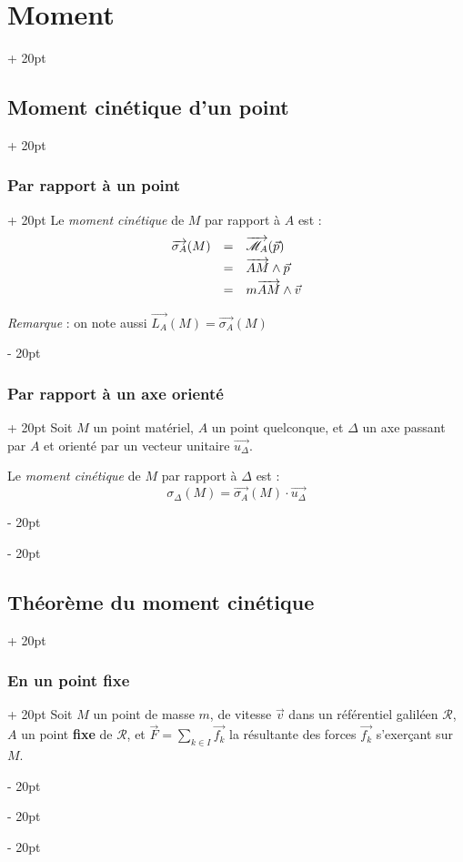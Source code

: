 \documentclass[a4paper, 12pt, twoside]{article}
\newcommand{\vect}{\overrightarrow}
\newcommand{\lr}[1]{\left( #1 \right)}
\newcommand{\ind}[1][20pt]{\advance\leftskip + #1}
\newcommand{\deind}[1][20pt]{\advance\leftskip - #1}
\newenvironment{indt}[2][20pt]{#2 \par \ind[#1]}{\par \deind} %
\begin{document}
\begin{indt}{\section{Moment}}
\begin{indt}{\subsection{Moment cinétique d'un point}}
\begin{indt}{\subsubsection{Par rapport à un point}}
                Le \textit{moment cinétique} de $M$ par rapport à $A$ est :
                \[
                    \begin{array}{rcl}
                        \vect{\sigma_A}(M)
                        &=& \vect{\mathscr M_A}\!\lr{\vec p}
                        \vspace{3pt}
                        \\
                        &=& \vect{AM} \wedge \vec p
                        \vspace{3pt}
                        \\
                        &=& m \vect{AM} \wedge \vec v
                    \end{array}
                \]

                \textit{Remarque} : on note aussi $\vect{L_A}(M) = \vect{\sigma_A}(M)$
            \end{indt}

            \vspace{12pt}
            
            \begin{indt}{\subsubsection{Par rapport à un axe orienté}}
                Soit $M$ un point matériel, $A$ un point quelconque, et $\Delta$ un axe passant par $A$ et orienté par un vecteur unitaire $\vect{u_\Delta}$.

                \vspace{6pt}
                
                Le \textit{moment cinétique} de $M$ par rapport à $\Delta$ est :
                \[
                    \sigma_\Delta(M) = \vect{\sigma_A}(M) \cdot \vect{u_\Delta}
                \]
            \end{indt}
        \end{indt}

        \vspace{12pt}
        
        \begin{indt}{\subsection{Théorème du moment cinétique}}
            \begin{indt}{\subsubsection{En un point fixe}}
                Soit $M$ un point de masse $m$, de vitesse $\vec v$ dans un référentiel galiléen $\mathscr R$, $A$ un point \textbf{fixe} de $\mathscr R$, et $\displaystyle \vec F = \sum_{k \in I} \vec{f_k}$ la résultante des forces $\vec{f_k}$ s'exerçant sur $M$.


\end{indt}
\end{indt}
\end{indt}
\end{document}
